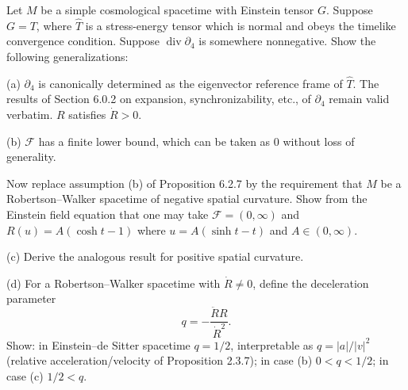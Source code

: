 Let $M$ be a simple cosmological spacetime with Einstein tensor $G$. Suppose $G = T$, where $\hat{T}$ is a stress-energy tensor which is normal and obeys the timelike convergence condition. Suppose $\operatorname{div} \partial_4$ is somewhere nonnegative. Show the following generalizations:

(a) $\partial_4$ is canonically determined as the eigenvector reference frame of $\hat{T}$. The results of Section 6.0.2 on expansion, synchronizability, etc., of $\partial_4$ remain valid verbatim. $R$ satisfies $\dot{R} > 0$.

(b) $\mathcal{F}$ has a finite lower bound, which can be taken as $0$ without loss of generality.

Now replace assumption (b) of Proposition 6.2.7 by the requirement that $M$ be a Robertson--Walker spacetime of negative spatial curvature. Show from the Einstein field equation that one may take $\mathcal{F} = (0, \infty)$ and $R(u) = A(\cosh t - 1)$ where $u = A(\sinh t - t)$ and $A \in (0, \infty)$.

(c) Derive the analogous result for positive spatial curvature.

(d) For a Robertson--Walker spacetime with $\dot{R} \neq 0$, define the deceleration parameter
$$q = -\frac{\ddot{R} R}{\dot{R}^2}.$$
Show: in Einstein--de Sitter spacetime $q = 1/2$, interpretable as $q = |a|/|v|^2$ (relative acceleration/velocity of Proposition 2.3.7); in case (b) $0 < q < 1/2$; in case (c) $1/2 < q$.
